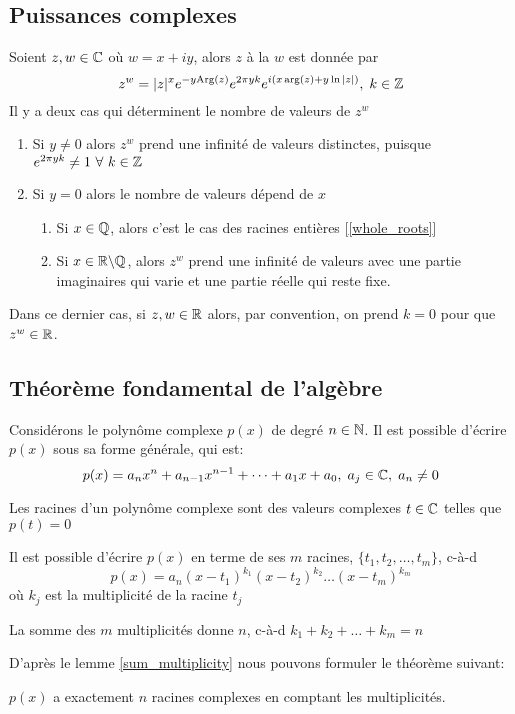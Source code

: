\subsection{Puissances complexes}
Soient $z, w \in \mathbb{C}$ où $w = x + iy$, alors $z$ à la $w$ est donnée par
\[
    z^w = |z|^{x} e^{-y\text{Arg}(z)} e^{2\pi yk} e^{ i \left(x\arg(z) + y\ln|z|\right) }, \; k \in \mathbb{Z}
\]
Il y a deux cas qui déterminent le nombre de valeurs de $z^w$
\begin{enumerate}
    \item Si $y \neq 0$ alors $z^w$ prend une infinité de valeurs distinctes, puisque $e^{2\pi yk} \neq 1 \ \forall \ k \in \mathbb{Z}$
    \item Si $y = 0$ alors le nombre de valeurs dépend de $x$
          \begin{enumerate}
              \item Si $x \in \mathbb{Q}$, alors c'est le cas des racines entières [\ref{whole_roots}]
              \item Si $x \in \mathbb{R} \backslash \mathbb{Q}$, alors $z^w$ prend une infinité de valeurs avec une partie imaginaires qui varie et une partie réelle qui reste fixe.
          \end{enumerate}
\end{enumerate}
\begin{remark}
    Dans ce dernier cas, si $z, w \in \mathbb{R}$ alors, par convention, on prend $k = 0$ pour que $z^w \in \mathbb{R}$.
\end{remark}

\subsection{Théorème fondamental de l'algèbre}
Considérons le polynôme complexe $p(x)$ de degré $n \in \mathbb{N}$. Il est possible d'écrire $p(x)$ sous sa forme générale, qui est:
\[
    p(x) = a_n x^n + a_{n-1} x^{n-1} + \dots + a_1 x + a_0, \; a_j \in \mathbb{C}, \; a_n \neq 0
\]
\begin{definition}
    Les racines d'un polynôme complexe sont des valeurs complexes $t \in \mathbb{C}$ telles que $p(t) = 0$
\end{definition}
\begin{lemma}
    Il est possible d'écrire $p(x)$ en terme de ses $m$ racines, $\{t_1, t_2, \dots ,t_m\}$, c-à-d
    \[ p(x) = a_n(x - t_1)^{k_1} (x - t_2)^{k_2} \dots (x - t_m)^{k_m} \]
    où $k_j$ est la multiplicité de la racine $t_j$
\end{lemma}
\begin{lemma}
    \label{sum_multiplicity}
    La somme des $m$ multiplicités donne $n$, c-à-d $k_1 + k_2 + \dots + k_m = n$
\end{lemma}
D'après le lemme \ref{sum_multiplicity} nous pouvons formuler le théorème suivant:
\begin{theorem}
    \label{theorem_fondamental_algebra}
    $p(x)$ a exactement $n$ racines complexes en comptant les multiplicités.
\end{theorem}
